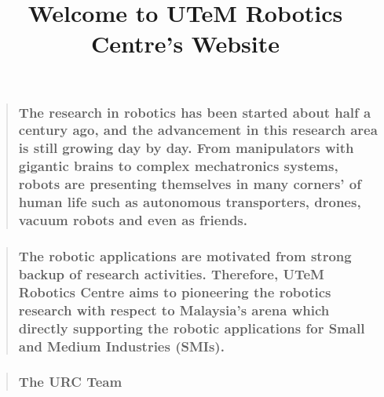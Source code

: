 \documentclass[]{article}
\title{Welcome to UTeM Robotics Centre's Website}
\author{}
\date{}
\begin{document}
\maketitle

\begin{quote}
\subsubsection{The research in robotics has been started about half a
century ago, and the advancement in this research area is still growing
day by day. From manipulators with gigantic brains to complex
mechatronics systems, robots are presenting themselves in many corners'
of human life such as autonomous transporters, drones, vacuum robots and
even as
friends.}\label{the-research-in-robotics-has-been-started-about-half-a-century-ago-and-the-advancement-in-this-research-area-is-still-growing-day-by-day.-from-manipulators-with-gigantic-brains-to-complex-mechatronics-systems-robots-are-presenting-themselves-in-many-corners-of-human-life-such-as-autonomous-transporters-drones-vacuum-robots-and-even-as-friends.}
\end{quote}

\begin{quote}
\subsubsection{The robotic applications are motivated from strong backup
of research activities. Therefore, UTeM Robotics Centre aims to
pioneering the robotics research with respect to Malaysia's arena which
directly supporting the robotic applications for Small and Medium
Industries
(SMIs).}\label{the-robotic-applications-are-motivated-from-strong-backup-of-research-activities.-therefore-utem-robotics-centre-aims-to-pioneering-the-robotics-research-with-respect-to-malaysias-arena-which-directly-supporting-the-robotic-applications-for-small-and-medium-industries-smis.}
\end{quote}

\begin{quote}
\subsubsection{The URC Team}\label{the-urc-team}
\end{quote}
\end{document}
